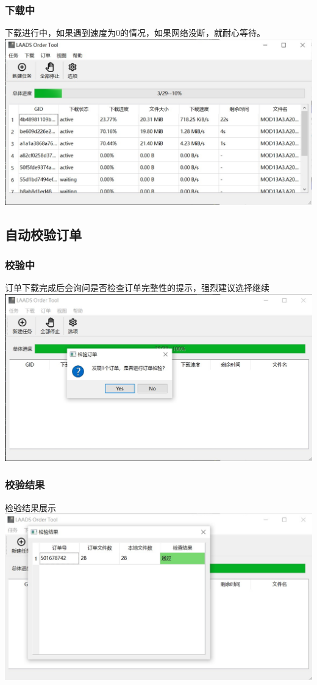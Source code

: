 \begin{frame}
    \frametitle{下载中}
    下载进行中，如果遇到速度为0的情况，如果网络没断，就耐心等待。
    \includegraphics[width=\linewidth]{images/2B.11下载中.jpg}
\end{frame}

\subsection{自动校验订单}

\begin{frame}
    \frametitle{校验中}
    订单下载完成后会询问是否检查订单完整性的提示，强烈建议选择继续
    \includegraphics[width=\linewidth]{images/2B.12下载完成.jpg}
\end{frame}

\begin{frame}
    \frametitle{校验结果}
    检验结果展示
    \includegraphics[width=\linewidth]{images/2B.13校验结果.jpg}
\end{frame}


